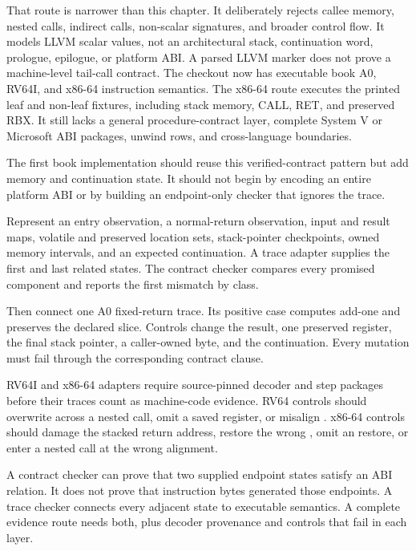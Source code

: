 That route is narrower than this chapter. It deliberately rejects callee
memory, nested calls, indirect calls, non-scalar signatures, and broader
control flow. It models LLVM scalar values, not an architectural stack,
continuation word, prologue, epilogue, or platform ABI. A parsed LLVM
 marker does not prove a machine-level tail-call contract. The
checkout now has executable book A0, RV64I, and x86-64 instruction semantics.
The x86-64 route executes the printed leaf and non-leaf fixtures, including
stack memory, CALL, RET, and preserved RBX. It still lacks a general
procedure-contract layer, complete System V or Microsoft ABI packages, unwind
rows, and cross-language boundaries.

The first book implementation should reuse this verified-contract pattern but
add memory and continuation state. It should not begin by encoding an entire
platform ABI or by building an endpoint-only checker that ignores the trace.

Represent an entry observation, a normal-return observation, input and result
maps, volatile and preserved location sets, stack-pointer checkpoints, owned
memory intervals, and an expected continuation. A trace adapter supplies the
first and last related states. The contract checker compares every promised
component and reports the first mismatch by class.

Then connect one A0 fixed-return trace. Its positive case computes add-one and
preserves the declared slice. Controls change the result, one preserved
register, the final stack pointer, a caller-owned byte, and the continuation.
Every mutation must fail through the corresponding contract clause.

RV64I and x86-64 adapters require source-pinned decoder and step packages
before their traces count as machine-code evidence. RV64 controls should
overwrite  across a nested call, omit a saved  register, or
misalign . x86-64 controls should damage the stacked return address,
restore the wrong , omit an  restore, or enter a nested
call at the wrong alignment.

\begin{goingdeeper}[title={Contract checking and semantic checking are different}]
A contract checker can prove that two supplied endpoint states satisfy an ABI
relation. It does not prove that instruction bytes generated those endpoints.
A trace checker connects every adjacent state to executable semantics. A
complete evidence route needs both, plus decoder provenance and controls that
fail in each layer.
\end{goingdeeper}


